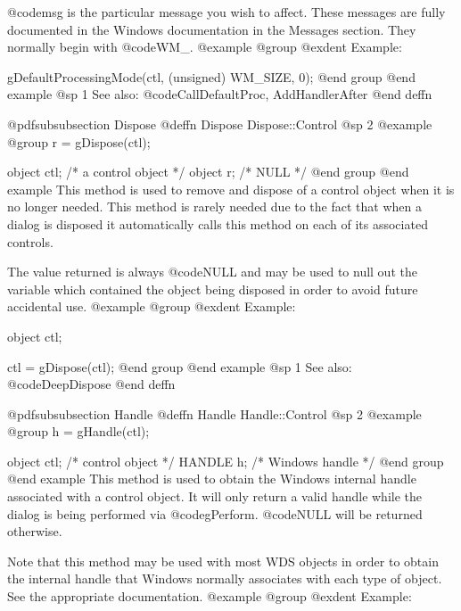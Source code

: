 @code{msg} is the particular message you wish to affect.  These messages
are fully documented in the Windows documentation in the Messages
section.  They normally begin with @code{WM_}.
@example
@group
@exdent Example:

gDefaultProcessingMode(ctl, (unsigned) WM_SIZE, 0);
@end group
@end example
@sp 1
See also:  @code{CallDefaultProc, AddHandlerAfter}
@end deffn











@pdfsubsubsection {Dispose}
@deffn {Dispose} Dispose::Control
@sp 2
@example
@group
r = gDispose(ctl);

object  ctl;   /*  a control object  */
object  r;     /*  NULL              */
@end group
@end example
This method is used to remove and dispose of a control object when it
is no longer needed.  This method is rarely needed due to the fact that
when a dialog is disposed it automatically calls this method on each of
its associated controls.

The value returned is always @code{NULL} and may be used to null out
the variable which contained the object being disposed in order to
avoid future accidental use.
@example
@group
@exdent Example:

object  ctl;

ctl = gDispose(ctl);
@end group
@end example
@sp 1
See also:  @code{DeepDispose}
@end deffn














@pdfsubsubsection {Handle}
@deffn {Handle} Handle::Control
@sp 2
@example
@group
h = gHandle(ctl);

object  ctl;    /*  control object   */
HANDLE  h;      /*  Windows handle  */
@end group
@end example
This method is used to obtain the Windows internal handle associated with
a control object.  It will only return a valid handle while the dialog
is being performed via @code{gPerform}.  @code{NULL} will be returned
otherwise.

Note that this method may be used with most WDS objects in order to obtain
the internal handle that Windows normally associates with each type of object.
See the appropriate documentation.
@example
@group
@exdent Example:

